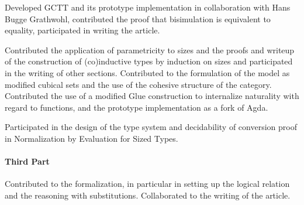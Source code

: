 \documentclass{book}
\begin{document}
Developed GCTT and its prototype implementation in collaboration with
Hans Bugge Grathwohl, contributed the proof that bisimulation is
equivalent to equality, participated in writing the article.

Contributed the application of parametricity to sizes and the proofs
and writeup of the construction of (co)inductive types by induction on
sizes and participated in the writing of other sections. Contributed
to the formulation of the model as modified cubical sets and the use
of the cohesive structure of the category. Contributed the use of a
modified Glue construction to internalize naturality with regard to
functions, and the prototype implementation as a fork of Agda.

Participated in the design of the type system and decidability of
conversion proof in Normalization by Evaluation for Sized Types.
\paragraph{Third Part}
Contributed to the formalization, in particular in setting up the
logical relation and the reasoning with substitutions. Collaborated
to the writing of the article.
\end{document}
